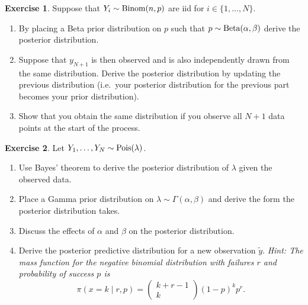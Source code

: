 \documentclass[
]{book}
\providecommand{\tightlist}{%
  \setlength{\itemsep}{0pt}\setlength{\parskip}{0pt}}
\theoremstyle{definition}
\theoremstyle{definition}
\theoremstyle{definition}
\newtheorem{exercise}{Exercise}[chapter]
\theoremstyle{definition}
\theoremstyle{remark}
\begin{document}
\begin{exercise}

Suppose that \(Y_i \sim \hbox{Binom}(n, p)\) are iid for \(i \in \{1, \ldots, N\}\).

\begin{enumerate}
\def\labelenumi{\arabic{enumi}.}
\tightlist
\item
  By placing a Beta prior distribution on \(p\) such that \(p \sim \hbox{Beta}(\alpha, \beta)\) derive the posterior distribution.
\item
  Suppose that \(y_{N+1}\) is then observed and is also independently drawn from the same distribution. Derive the posterior distribution by updating the previous distribution (i.e.~your posterior distribution for the previous part becomes your prior distribution).
\item
  Show that you obtain the same distribution if you observe all \(N+1\) data points at the start of the process.
\end{enumerate}

\end{exercise}

\begin{exercise}

Let \(Y_1, \ldots, Y_N \sim \hbox{Pois}(\lambda)\).

\begin{enumerate}
\def\labelenumi{\arabic{enumi}.}
\tightlist
\item
  Use Bayes' theorem to derive the posterior distribution of \(\lambda\) given the observed data.
\item
  Place a Gamma prior distribution on \(\lambda \sim \Gamma(\alpha, \beta)\) and derive the form the posterior distribution takes.
\item
  Discuss the effects of \(\alpha\) and \(\beta\) on the posterior distribution.
\item
  Derive the posterior predictive distribution for a new observation \(\tilde{y}\). \emph{Hint: The mass function for the negative binomial distribution with failures \(r\) and probability of success \(p\) is }
  \[
  \pi(x = k \mid r, p) = \begin{pmatrix} k + r - 1 \\ k \end{pmatrix} (1-p)^k p^r.
   \]
\end{enumerate}

\end{exercise}
\end{document}
